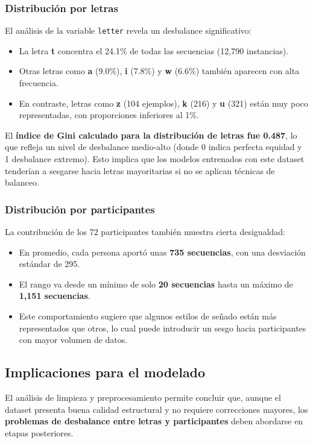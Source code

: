\documentclass[12pt]{article}
\begin{document}
\subsubsection*{Distribución por letras}
El análisis de la variable \texttt{letter} revela un desbalance significativo:
\begin{itemize}
    \item La letra \textbf{t} concentra el 24.1\% de todas las secuencias (12,790 instancias).
    \item Otras letras como \textbf{a} (9.0\%), \textbf{i} (7.8\%) y \textbf{w} (6.6\%) también aparecen con alta frecuencia.
    \item En contraste, letras como \textbf{z} (104 ejemplos), \textbf{k} (216) y \textbf{u} (321) están muy poco representadas, con proporciones inferiores al 1\%.
\end{itemize}

El \textbf{índice de Gini calculado para la distribución de letras fue 0.487}, lo que refleja un nivel de desbalance medio-alto (donde 0 indica perfecta equidad y 1 desbalance extremo). Esto implica que los modelos entrenados con este dataset tenderían a sesgarse hacia letras mayoritarias si no se aplican técnicas de balanceo.

\subsubsection*{Distribución por participantes}
La contribución de los 72 participantes también muestra cierta desigualdad:
\begin{itemize}
    \item En promedio, cada persona aportó unas \textbf{735 secuencias}, con una desviación estándar de 295.
    \item El rango va desde un mínimo de solo \textbf{20 secuencias} hasta un máximo de \textbf{1,151 secuencias}.
    \item Este comportamiento sugiere que algunos estilos de señado están más representados que otros, lo cual puede introducir un sesgo hacia participantes con mayor volumen de datos.
\end{itemize}

\subsection{Implicaciones para el modelado}
El análisis de limpieza y preprocesamiento permite concluir que, aunque el dataset presenta buena calidad estructural y no requiere correcciones mayores, los \textbf{problemas de desbalance entre letras y participantes} deben abordarse en etapas posteriores.
\end{document}
